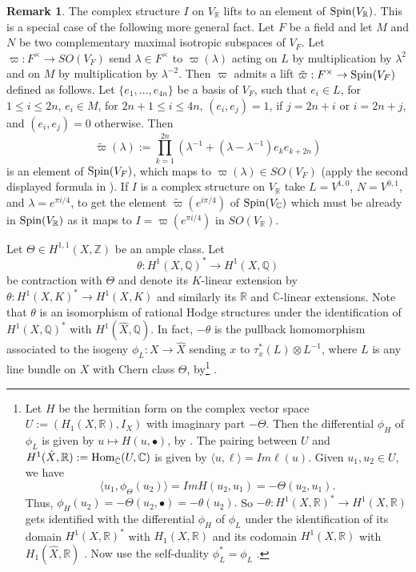 \documentclass[12pt]{amsart}
\numberwithin{equation}{subsection}
\theoremstyle{plain}
\theoremstyle{definition}
\newtheorem{rem}[thm]{Remark}
\newcommand{\CC}{{\mathbb C}}
\newcommand{\QQ}{{\mathbb Q}}
\newcommand{\RR}{{\mathbb R}}
\newcommand{\ZZ}{{\mathbb Z}}
\newcommand{\Spin}{{\rm Spin}}
\newcommand{\Hom}{{\rm Hom}}
\begin{document}
\begin{rem}
\label{rem-complex-structure-lifts-to-Spin-V-RR}
The complex structure $I$ on $V_\RR$ lifts to an element of $\Spin(V_\RR)$. This is a special case of the following more general fact. Let $F$ be a field and let $M$ and $N$ be two complementary maximal isotropic subspaces of $V_F$. Let $\varpi:F^\times\rightarrow SO(V_F)$ send $\lambda\in F^\times$ to $\varpi(\lambda)$ acting on $L$ by multiplication by $\lambda^2$ and on $M$ by multiplication by $\lambda^{-2}$. Then $\varpi$ admits a lift  $\tilde{\varpi}:F^\times \rightarrow \Spin(V_F)$ defined as follows. Let $\{e_1, \dots, e_{4n}\}$ be a basis of $V_F$, such that $e_i\in L$, for $1\leq i\leq 2n$,  $e_i\in M$, for $2n+1\leq i\leq 4n$,  $(e_i,e_j)=1$, if $j=2n+i$ or $i=2n+j$, and $(e_i,e_j)=0$ otherwise. Then 
\[
\tilde{\varpi}(\lambda):=\prod_{k=1}^{2n}(\lambda^{-1}+(\lambda-\lambda^{-1})e_ke_{k+2n})
\]
is an element of $\Spin(V_F)$, which maps to $\varpi(\lambda)\in SO(V_F)$ (apply the second displayed formula in \cite[Sec. 2]{igusa}). If $I$ is a complex structure on $V_\RR$ take $L=V^{1,0}$, $N=V^{0,1}$, and $\lambda=e^{\pi i/4}$, to get the element
$\tilde{\varpi}(e^{i\pi/4})$ of $\Spin(V_\CC)$ which must be already in $\Spin(V_\RR)$ as it maps to $I=\varpi(e^{\pi i/4})$ in $SO(V_\RR)$.
\end{rem}

Let $\Theta\in H^{1,1}(X,\ZZ)$ be an ample class. 
Let 
\begin{equation}
\label{eq-theta-is-contraction-with-Theta}
\theta:H^1(X,\QQ)^*\rightarrow H^1(X,\QQ)
\end{equation}
be contraction with $\Theta$ and denote its $K$-linear extension by $\theta:H^1(X,K)^*\rightarrow H^1(X,K)$ and similarly its $\RR$ and $\CC$-linear extensions. 
Note that $\theta$ is an isomorphism of rational Hodge structures under the identification of 
$H^1(X,\QQ)^*$ with $H^1(\hat{X},\QQ)$. 
In fact, $-\theta$ is the pullback homomorphism associated to the isogeny
$\phi_L:X\rightarrow \hat{X}$ sending $x$ to $\tau_x^*(L)\otimes L^{-1}$, where $L$ is any line bundle on $X$ with Chern class $\Theta$, by\footnote{
Let $H$ be the hermitian form on the complex vector space $U:=(H_1(X,\RR),I_X)$ with imaginary part $-\Theta$. Then the differential 
$\phi_H$ of $\phi_L$ is given by $u\mapsto H(u,\bullet)$, by \cite[Lemma 2.4.5 and 3.6.4]{BL}. The pairing between 
$U$ and $H^1(\hat{X},\RR):=\Hom_{\bar{\CC}}(U,\CC)$ is given by $\langle u,\ell\rangle=Im\ell(u)$. Given $u_1, u_2\in  U$, we have
\[
\langle u_1,\phi_\Theta(u_2)\rangle=Im H(u_2,u_1)=-\Theta(u_2,u_1).
\]
Thus, $\phi_H(u_2)=-\Theta(u_2,\bullet)=-\theta(u_2).$ So $-\theta:H^1(X,\RR)^*\rightarrow H^1(X,\RR)$ gets identified with the differential $\phi_H$ of $\phi_L$ under the identification of its domain $H^1(X,\RR)^*$ with $H_1(X,\RR)$ and its codomain $H^1(X,\RR)$ with $H_1(\hat{X},\RR)$ . Now use the self-duality $\phi_L^*=\phi_L$ \cite[Cor 2.4.6]{BL}.
} 
\cite[Lemma 2.4.5]{BL}. 
\end{document}
